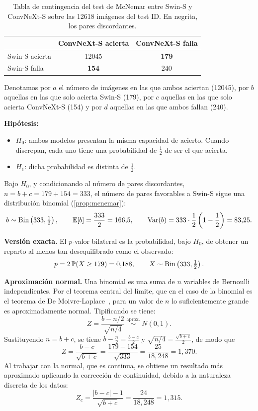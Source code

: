 \begin{table}[H]
  \centering
  \caption{Tabla de contingencia del test de McNemar entre Swin-S y ConvNeXt-S sobre las \num{12618} imágenes del test ID. En negrita, los pares discordantes.}
  \label{tab:mcnemar-swin-convnext}
  \begin{tabular*}{\linewidth}{@{\extracolsep{\fill}}lcc}
    \toprule
    & ConvNeXt-S acierta & ConvNeXt-S falla \\
    \midrule
    Swin-S acierta & \num{12045} & \textbf{179} \\
    Swin-S falla   & \textbf{154} & 240 \\
    \bottomrule
  \end{tabular*}
\end{table}

Denotamos por $a$ el número de imágenes en las que ambos aciertan (\num{12045}), por $b$ aquellas en las que solo acierta Swin-S (179), por $c$ aquellas en las que solo acierta ConvNeXt-S (154) y por $d$ aquellas en las que ambos fallan (240).

\textbf{Hipótesis:}
\begin{itemize}
  \item $H_0$: ambos modelos presentan la misma capacidad de acierto. Cuando discrepan, cada uno tiene una probabilidad de $\tfrac{1}{2}$ de ser el que acierta.
  \item $H_1$: dicha probabilidad es distinta de $\tfrac{1}{2}$.
\end{itemize}

Bajo $H_0$, y condicionando al número de pares discordantes, $n = b + c = 179 + 154 = 333$, el número de pares favorables a Swin-S sigue una distribución binomial (\cref{prop:mcnemar}):
\[
  b \sim \mathrm{Bin}\left(333, \tfrac{1}{2}\right), \qquad
  \operatorname{\mathbb{E}}[b] = \frac{333}{2} = 166{,}5, \qquad
  \operatorname{Var}(b) = 333 \cdot \frac{1}{2}\left(1 - \frac{1}{2}\right) = 83{,}25.
\]

\textbf{Versión exacta.} El $p$-valor bilateral es la probabilidad, bajo $H_0$, de obtener un reparto al menos tan desequilibrado como el observado:
\[
  p = 2\,\mathbb{P}(X \geq 179) = 0{,}188, \qquad X \sim \mathrm{Bin}\left(333, \tfrac{1}{2}\right).
\]

\textbf{Aproximación normal.} Una binomial es una suma de $n$ variables de Bernoulli independientes. Por el teorema central del límite, que en el caso de la binomial es el teorema de De Moivre-Laplace~\cite{canavos2003}, para un valor de $n$ lo suficientemente grande es aproximadamente normal. Tipificando se tiene:
\[
  Z = \frac{b - n/2}{\sqrt{n/4}} \;\overset{\text{aprox.}}{\sim}\; N(0, 1).
\]
Sustituyendo $n = b + c$, se tiene $b - \frac{n}{2} = \frac{b - c}{2}$ y $\sqrt{n/4} = \frac{\sqrt{b + c}}{2}$, de modo que
\[
  Z = \frac{b - c}{\sqrt{b + c}} = \frac{179 - 154}{\sqrt{333}} = \frac{25}{18{,}248} = 1{,}370.
\]
Al trabajar con la normal, que es continua, se obtiene un resultado más aproximado aplicando la corrección de continuidad, debido a la naturaleza discreta de los datos:
\[
  Z_c = \frac{|b - c| - 1}{\sqrt{b + c}} = \frac{24}{18{,}248} = 1{,}315.
\]


